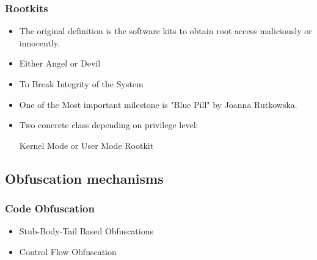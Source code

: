 \documentclass{beamer}
\begin{document}

\begin{frame}
	\frametitle{Rootkits}
	\begin{itemize}
		\item The original definition is the software kits to obtain root access maliciously or innocently.
		\item Either Angel or Devil
		\item To Break Integrity of the System
		\item One of the Most important milestone is "Blue Pill" by Joanna Rutkowska.
		\item Two concrete class depending on privilege level:\\ \centerline{{Kernel Mode or User Mode Rootkit}}
	\end{itemize}
\end{frame}

\subsection{Obfuscation mechanisms}

\begin{frame}
	\frametitle{Code Obfuscation}
	\begin{itemize}
		\LARGE
		\item Stub-Body-Tail Based Obfuscations
		\item Control Flow Obfuscation
	\end{itemize}
\end{frame}
\end{document}
